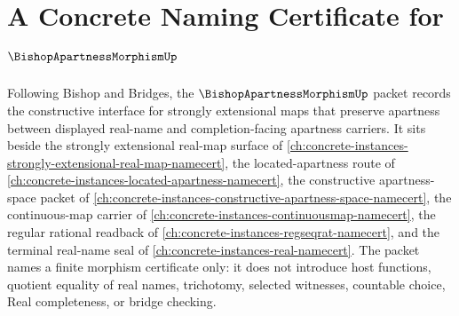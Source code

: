 \chapter{A Concrete Naming Certificate for $\BishopApartnessMorphismUp$}
\label{ch:concrete-instances-bishop-apartness-morphism-namecert}

Following Bishop and Bridges, the $\BishopApartnessMorphismUp$ packet records the constructive interface for strongly extensional maps that preserve apartness between displayed real-name and completion-facing apartness carriers. It sits beside the strongly extensional real-map surface of \autoref{ch:concrete-instances-strongly-extensional-real-map-namecert}, the located-apartness route of \autoref{ch:concrete-instances-located-apartness-namecert}, the constructive apartness-space packet of \autoref{ch:concrete-instances-constructive-apartness-space-namecert}, the continuous-map carrier of \autoref{ch:concrete-instances-continuousmap-namecert}, the regular rational readback of \autoref{ch:concrete-instances-regseqrat-namecert}, and the terminal real-name seal of \autoref{ch:concrete-instances-real-namecert}. The packet names a finite morphism certificate only: it does not introduce host functions, quotient equality of real names, trichotomy, selected witnesses, countable choice, Real completeness, or bridge checking.

